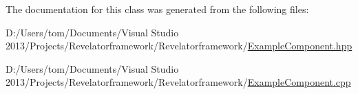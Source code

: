 The documentation for this class was generated from the following files\-:\begin{DoxyCompactItemize}
\item 
D\-:/\-Users/tom/\-Documents/\-Visual Studio 2013/\-Projects/\-Revelatorframework/\-Revelatorframework/\hyperlink{_example_component_8hpp}{Example\-Component.\-hpp}\item 
D\-:/\-Users/tom/\-Documents/\-Visual Studio 2013/\-Projects/\-Revelatorframework/\-Revelatorframework/\hyperlink{_example_component_8cpp}{Example\-Component.\-cpp}\end{DoxyCompactItemize}
